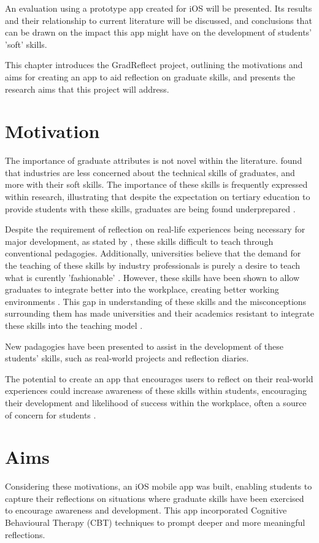 \documentclass{l4proj}
\begin{document}
An evaluation using a prototype app created for iOS will be presented. Its results and their relationship to current literature will be discussed, and conclusions that can be drawn on the impact this app might have on the development of students' 'soft' skills.

This chapter introduces the GradReflect project, outlining the motivations and aims for creating an app to aid reflection on graduate skills, and presents the research aims that this project will address.

\section{Motivation}
The importance of graduate attributes is not novel within the literature. \citet{litchfield_contextualising_2010} found that industries are less concerned about the technical skills of graduates, and more with their soft skills. The importance of these skills is frequently expressed within research, illustrating that despite the expectation on tertiary education to provide students with these skills, graduates are being found underprepared \citep{stevens_industry_2016}. 

Despite the requirement of reflection on real-life experiences being necessary for major development, as stated by \citet{abernethy_teaching_2009}, these skills difficult to teach through conventional pedagogies. Additionally, universities believe that the demand for the teaching of these skills by industry professionals is purely a desire to teach what is curently 'fashionable' \citep{stevens_industry_2016}. However, these skills have been shown to allow graduates to integrate better into the workplace, creating better working environments \citep{stevens_industry_2016}. This gap in understanding of these skills and the misconceptions surrounding them has made universities and their academics resistant to integrate these skills into the teaching model \citep{barr_2019}. 

New padagogies have been presented to assist in the development of these students' skills, such as real-world projects and reflection diaries.

The potential to create an app that encourages users to reflect on their real-world experiences could increase awareness of these skills within students, encouraging their development and likelihood of success within the workplace, often a source of concern for students \citep{stevens_industry_2016}.

\section{Aims} \label{IntroAims}
Considering these motivations, an iOS mobile app was built, enabling students to capture their reflections on situations where graduate skills have been exercised to encourage awareness and development. This app incorporated Cognitive Behavioural Therapy (CBT) techniques to prompt deeper and more meaningful reflections. 
\end{document}
